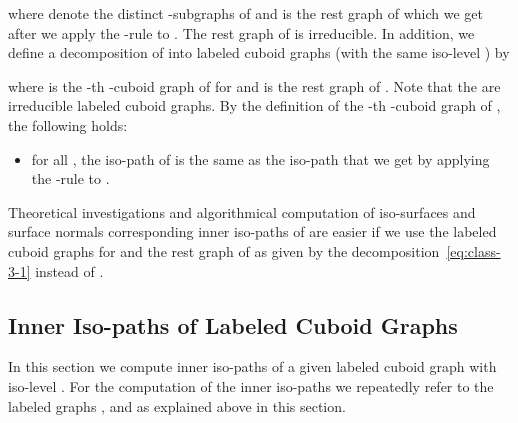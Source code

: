 \documentclass[a4paper,11pt]{article}
\begin{document}
where  denote the  distinct -subgraphs of  and 
is the rest graph of  which we get after we apply the -rule to . The rest graph  of 
is irreducible. In addition, we define a decomposition  of  into labeled cuboid graphs
(with the same iso-level ) by

where  is the -th -cuboid graph of  for  and  is the rest graph of .
Note that the  are irreducible labeled cuboid graphs. By the definition of the -th
-cuboid graph of , the following holds:
\begin{itemize}
\item for all , the iso-path of  is the same as the iso-path that we get by
applying the -rule to .
\end{itemize}
Theoretical investigations and algorithmical computation of iso-surfaces and surface normals corresponding
inner iso-paths of  are easier if we use the labeled cuboid graphs  for  and the rest
graph  of  as given by the decomposition~\eqref{eq:class-3-1} instead of .

\subsection{Inner Iso-paths of Labeled Cuboid Graphs}
In this section we compute inner iso-paths of a given labeled cuboid graph  with iso-level
. For the computation of the inner iso-paths we repeatedly refer to the labeled graphs ,
 and  as explained above in this section.
\end{document}
